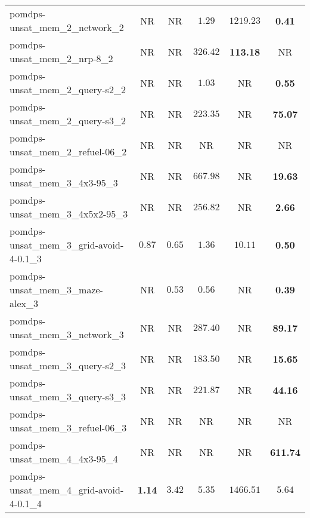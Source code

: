 \begin{tabular}{lccccc}
pomdps-unsat\_mem\_2\_network\_2 & NR & NR & $1.29$ & $1219.23$ & \textbf{0.41} \\
pomdps-unsat\_mem\_2\_nrp-8\_2 & NR & NR & $326.42$ & \textbf{113.18} & NR \\
pomdps-unsat\_mem\_2\_query-s2\_2 & NR & NR & $1.03$ & NR & \textbf{0.55} \\
pomdps-unsat\_mem\_2\_query-s3\_2 & NR & NR & $223.35$ & NR & \textbf{75.07} \\
pomdps-unsat\_mem\_2\_refuel-06\_2 & NR & NR & NR & NR & NR \\
pomdps-unsat\_mem\_3\_4x3-95\_3 & NR & NR & $667.98$ & NR & \textbf{19.63} \\
pomdps-unsat\_mem\_3\_4x5x2-95\_3 & NR & NR & $256.82$ & NR & \textbf{2.66} \\
pomdps-unsat\_mem\_3\_grid-avoid-4-0.1\_3 & $0.87$ & $0.65$ & $1.36$ & $10.11$ & \textbf{0.50} \\
pomdps-unsat\_mem\_3\_maze-alex\_3 & NR & $0.53$ & $0.56$ & NR & \textbf{0.39} \\
pomdps-unsat\_mem\_3\_network\_3 & NR & NR & $287.40$ & NR & \textbf{89.17} \\
pomdps-unsat\_mem\_3\_query-s2\_3 & NR & NR & $183.50$ & NR & \textbf{15.65} \\
pomdps-unsat\_mem\_3\_query-s3\_3 & NR & NR & $221.87$ & NR & \textbf{44.16} \\
pomdps-unsat\_mem\_3\_refuel-06\_3 & NR & NR & NR & NR & NR \\
pomdps-unsat\_mem\_4\_4x3-95\_4 & NR & NR & NR & NR & \textbf{611.74} \\
pomdps-unsat\_mem\_4\_grid-avoid-4-0.1\_4 & \textbf{1.14} & $3.42$ & $5.35$ & $1466.51$ & $5.64$ \\
\bottomrule
\end{tabular}
